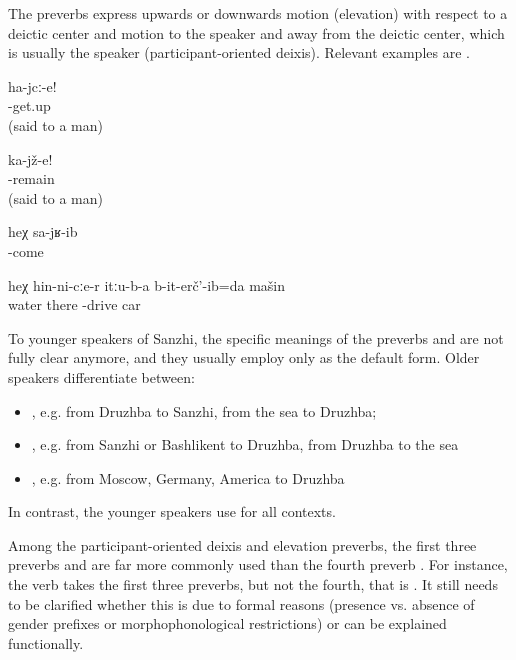 The preverbs express upwards or downwards motion (elevation) with respect to a deictic center and motion to the speaker and away from the deictic center, which is usually the speaker (participant-oriented deixis). Relevant examples are .
%
\begin{exe}
	\ex	\label{ex:Get up (said to a man) verbs}
	\gll	ha-jcː-e!\\
		-get.up\\
	\glt	{}(said to a man)

	\ex	\label{ex:Sit down (said to a man) verbs}
	\gll	ka-jž-e!\\
		-remain\\
	\glt	{} (said to a man)

	\ex	\label{ex:He came back verbs}
	\gll	heχ	sa-jʁ-ib\\
			-come\\
	\glt	{}

	\ex	\label{ex:Down through that water I drove the car verbs}
	\gll	heχ	hin-ni-cːe-r	itːu-b-a	b-it-erč'-ib=da	mašin\\
			water	there	-drive	car\\
	\glt	{}
\end{exe}

To younger speakers of Sanzhi, the specific meanings of the preverbs  and  are not fully clear anymore, and they usually employ only  as the default form. Older speakers differentiate between:
%
\begin{itemize}
	\item	{} , e.g. from Druzhba to Sanzhi, from the sea to Druzhba;
	\item	{} , e.g. from Sanzhi or Bashlikent to Druzhba, from Druzhba to the sea
	\item	{} , e.g. from Moscow, Germany, America to Druzhba
\end{itemize}
%
In contrast, the younger speakers use  for all contexts.

Among the participant-oriented deixis and elevation preverbs, the first three preverbs  and  are far more commonly used than the fourth preverb . For instance, the verb  takes the first three preverbs, but not the fourth, that is . It still needs to be clarified whether this is due to formal reasons (presence vs. absence of gender prefixes or morphophonological restrictions) or can be explained functionally. 

